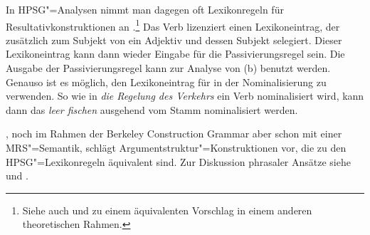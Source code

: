 In HPSG"=Analysen nimmt man dagegen oft Lexikonregeln für Resultativkonstruktionen an
\parencites{Wechsler97a,WN2001a,Verspoor97a}[Kapitel~6]{Mueller2002b,MWArgSt,MuellerLFGphrasal}.\footnote{
  Siehe auch  und
zu einem äquivalenten Vorschlag in einem
  anderen theoretischen Rahmen.%
}
Das Verb  lizenziert einen Lexikoneintrag, der zusätzlich zum Subjekt von 
ein Adjektiv und dessen Subjekt selegiert. Dieser Lexikoneintrag kann dann wieder Eingabe
für die Passivierungsregel sein. Die Ausgabe der Passivierungsregel kann zur Analyse von (b)
benutzt werden. Genauso ist es möglich, den Lexikoneintrag für  in der Nominalisierung
zu verwenden. So wie in \emph{die Regelung des Verkehrs} ein Verb nominalisiert wird, kann dann das
\emph{leer fischen} ausgehend vom Stamm nominalisiert werden.

\citet{Kay2005a}, noch im Rahmen der Berkeley Construction Grammar aber schon mit einer MRS"=Semantik, schlägt Argumentstruktur"=Konstruktionen vor,
die zu den HPSG"=Lexikonregeln äquivalent sind. Zur Diskussion phrasaler Ansätze siehe
\textcites{Mueller2006d,Mueller2006c,Mueller2007d,MuellerUnifying,MuellerLFGphrasal,MuellerLexikon,MuellerGT-Eng5,MuellerLFGTAG,MuellerTAGCxG}
und \textcites{MWArgSt,MWArgStReply}.
%

